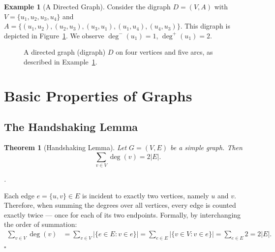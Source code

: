 \documentclass[12pt,a4paper]{article}
\theoremstyle{definition}
\newtheorem{example}{Example}[section]
\theoremstyle{plain}
\newtheorem{theorem}{Theorem}[section]
\renewenvironment{proof}[1][\proofname]{%
  \par\noindent\textit{#1.}\enspace\ignorespaces
}{%
  \hfill$\square$\par\medskip
}
\newcommand{\dg}[1]{\deg(#1)}
\newcommand{\indeg}[1]{\deg^{-}(#1)}
\newcommand{\outdeg}[1]{\deg^{+}(#1)}
\begin{document}
\begin{example}[A Directed Graph]\label{ex:digraph}
  Consider the digraph \(D = (V,A)\) with
  \(V = \{u_1, u_2, u_3, u_4\}\) and
  \(A = \{(u_1,u_2),(u_2,u_3),(u_3,u_1),(u_1,u_4),(u_4,u_3)\}\).
  This digraph is depicted in Figure~\ref{fig:digraph}.
  We observe \(\indeg{u_1} = 1\), \(\outdeg{u_1} = 2\).
\end{example}

\begin{figure}[htbp]
  \centering
  \caption{A directed graph (digraph) \(D\) on four vertices and five arcs,
           as described in Example~\ref{ex:digraph}.}
  \label{fig:digraph}
\end{figure}

\section{Basic Properties of Graphs}
\label{sec:properties}

\subsection{The Handshaking Lemma}

\begin{theorem}[Handshaking Lemma]\label{thm:handshake}
  Let \(G = (V,E)\) be a simple graph.  Then
  \begin{equation}
    \sum_{v \in V} \dg{v} = 2|E|.
    \label{eq:handshake}
  \end{equation}
\end{theorem}

\begin{proof}
  Each edge \(e = \{u,v\} \in E\) is incident to exactly two vertices,
  namely \(u\) and \(v\).  Therefore, when summing the degrees over all
  vertices, every edge is counted exactly twice — once for each of its two
  endpoints.  Formally, by interchanging the order of summation:
  \begin{align}
    \sum_{v \in V} \dg{v}
    &= \sum_{v \in V} \bigl|\{e \in E : v \in e\}\bigr|
     = \sum_{e \in E} \bigl|\{v \in V : v \in e\}\bigr|
     = \sum_{e \in E} 2
     = 2|E|. \label{eq:handshake-proof}
  \end{align}
\end{proof}
\end{document}
